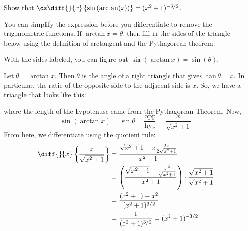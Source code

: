 \begin{Mquestion}
Show that $\ds\diff{}{x}\left\{\sin\left(\arctan(x)
\right)\right\} = (x^2+1)^{-3/2}$.
\end{Mquestion}
\begin{hint}
You can simplify the expression before you differentiate to remove the trigonometric functions. If $\arctan x =\theta$, then fill in the sides of the triangle below using the definition of arctangent and the Pythagorean theorem:
\begin{center}\end{center}
With the sides labeled, you can figure out $\sin\left(\arctan x\right)=\sin\left(\theta\right)$.
\end{hint}
\begin{answer}
Let $\theta = \arctan x$. Then $\theta$ is the angle of a right triangle that gives $\tan \theta = x$. In particular, the ratio of the opposite side to the adjacent side is $x$. So, we have a  triangle that looks like this:
\begin{center}\end{center}
where the length of the hypotenuse came from the Pythagorean Theorem. Now,
\[\sin\left(\arctan x\right) = \sin \theta = \frac{\mbox{opp}}{\mbox{hyp}} = \frac{x}{\sqrt{x^2+1}}\]
From here, we differentiate using the quotient rule:
\begin{align*}
\diff{}{x}\left\{\frac{x}{\sqrt{x^2+1}}
\right\}&=
\frac{\sqrt{x^2+1}-x\frac{2x}{2\sqrt{x^2+1}}}{x^2+1}\\
&=\left(\frac{\sqrt{x^2+1}-\frac{x^2}{\sqrt{x^2+1}}}{x^2+1}\right)\cdot\frac{\sqrt{x^2+1}}{\sqrt{x^2+1}}\\
&=\frac{(x^2+1)-x^2}{(x^2+1)^{3/2}}\\
&=\frac{1}{(x^2+1)^{3/2}}=(x^2+1)^{-3/2}
\end{align*}\end{answer}
